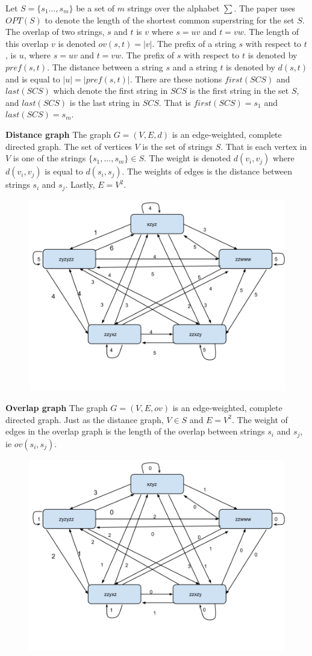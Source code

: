 \documentclass[letterpaper,11pt,titlepage]{article}
\begin{document}
Let $S = \{s_1 \ldots, s_m\}$ be a set of $m$ strings over the alphabet $\sum$. The paper uses $OPT(S)$ to denote the length of the shortest common superstring for the set $S$. The overlap of two strings, $s$ and $t$ is $v$ where $s=uv$ and $t=vw$. The length of this overlap $v$ is denoted $ov(s,t) = |v|$. The prefix of a string $s$ with respect to $t$, is $u$, where $s=uv$ and $t=vw$. The prefix of $s$ with respect to $t$ is denoted by $pref(s,t)$. The distance between a string $s$ and a string $t$ is denoted by $d(s,t)$ and is equal to $|u| = |pref(s,t)|$. There are these notions $first(SCS)$ and $last(SCS)$ which denote the first string in $SCS$ is the first string in the set $S$, and $last(SCS)$ is the last string in $SCS$. That is $first(SCS) = s_1$ and $last(SCS) = s_m$.

\newpage

\textbf{Distance graph}
The graph $G = (V,E,d)$ is an edge-weighted, complete directed graph. The set of vertices $V$ is the set of strings $S$. That is each vertex in $V$ is one of the strings $\{s_1, ..., s_m\} \in S$. The weight is denoted $d(v_i,v_j)$ where $d(v_i,v_j)$ is equal to $d(s_i,s_j)$. The weights of edges is the distance between strings $s_i$ and $s_j$. Lastly, $E=V^2$.

\begin{figure}[h]
 \centering
   \includegraphics[width=.6\textwidth]{distance.png}
\end{figure}


\textbf{Overlap graph}
The graph $G = (V,E,ov)$ is an edge-weighted, complete directed graph. Just as the distance graph, $V \in S$ and $E=V^2$. The weight of edges in the overlap graph is the length of the overlap between strings $s_i$ and $s_j$, ie $ov(s_i,s_j)$. 

\begin{figure}[h]
 \centering
   \includegraphics[width=.6\textwidth]{overlap.png}
\end{figure}
\end{document}
